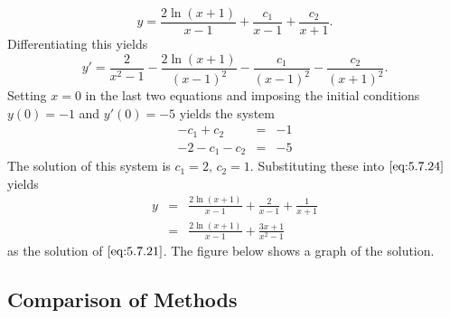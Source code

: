 \documentclass{ximera}
\begin{document}
\begin{example}
\begin{explanation}
\begin{equation}
y=\frac{2\ln(x+1)}{x-1}+\frac{c_1}{x-1}+\frac{c_2}{x+1}.
\end{equation}
Differentiating this yields
$$
y'=\frac{2}{x^2-1}-\frac{2\ln(x+1)}{(x-1)^2}-\frac{c_1}{(x-1)^2}-\frac{c_2}{(x+1)^2}.
$$
Setting $x=0$ in the last two equations and imposing the initial conditions
$y(0)=-1$ and $y'(0)=-5$ yields the system
\begin{eqnarray*}
-c_1+c_2&=&-1\\
-2-c_1-c_2&=&-5
\end{eqnarray*}
The solution of this system is $c_1=2,\,c_2=1$.  Substituting
these into
$\eqref{eq:5.7.24}$ yields
\begin{eqnarray*}
y&=&\frac{2\ln(x+1)}{x-1}+\frac{2}{x-1}+\frac{1}{x+1}\\
&=&\frac{2\ln(x+1)}{x-1}+\frac{3x+1}{x^2-1}
\end{eqnarray*}
as the solution of  $\eqref{eq:5.7.21}$. The figure below shows a graph of the solution.

\begin{center}
\end{center}
 
\end{explanation}
\end{example}
 
\subsection*{Comparison of Methods}
 
\end{document}
